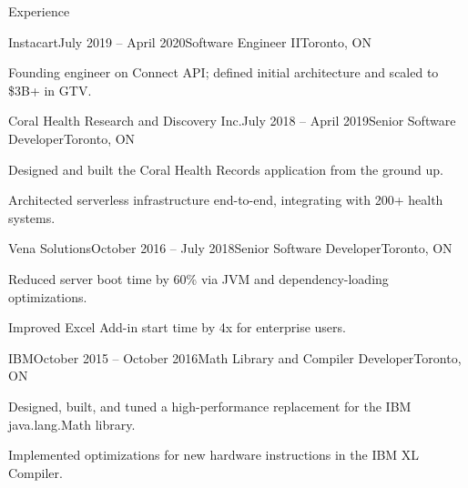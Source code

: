 \documentclass{resume} %
\begin{document}
\begin{rSection}{Experience}

\begin{rSubsection}{Instacart}{July 2019 -- April 2020}{Software Engineer II}{Toronto, ON}
\item Founding engineer on Connect API; defined initial architecture and scaled to \$3B+ in GTV.
\end{rSubsection}


\begin{rSubsection}{Coral Health Research and Discovery Inc.}{July 2018 -- April 2019}{Senior Software Developer}{Toronto, ON}
\item Designed and built the Coral Health Records application from the ground up.
\item Architected serverless infrastructure end-to-end, integrating with 200+ health systems.
\end{rSubsection}


\begin{rSubsection}{Vena Solutions}{October 2016 -- July 2018}{Senior Software Developer}{Toronto, ON}
\item Reduced server boot time by 60\% via JVM and dependency-loading optimizations.
\item Improved Excel Add-in start time by 4x for enterprise users.
\end{rSubsection}


\begin{rSubsection}{IBM}{October 2015 -- October 2016}{Math Library and Compiler Developer}{Toronto, ON}
\item Designed, built, and tuned a high-performance replacement for the IBM java.lang.Math library.
\item Implemented optimizations for new hardware instructions in the IBM XL Compiler.
\end{rSubsection}

\end{rSection}

\end{document}
